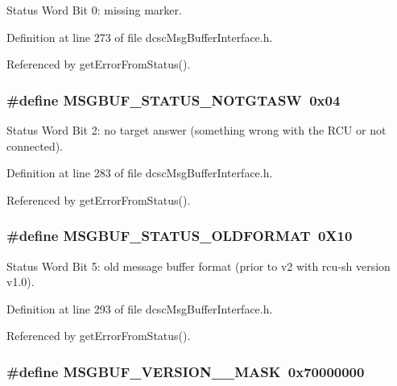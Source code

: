 Status Word Bit 0: missing marker. 



Definition at line 273 of file dcsc\-Msg\-Buffer\-Interface.h.

Referenced by get\-Error\-From\-Status().\hypertarget{group__dcsc__msg__buffer__access_g4eee888217162b8a35eb12d67cb4693b}{
\subsubsection[MSGBUF\_\-STATUS\_\-NOTGTASW]{\setlength{\rightskip}{0pt plus 5cm}\#define MSGBUF\_\-STATUS\_\-NOTGTASW~0x04}}
\label{group__dcsc__msg__buffer__access_g4eee888217162b8a35eb12d67cb4693b}


Status Word Bit 2: no target answer (something wrong with the RCU or not connected). 



Definition at line 283 of file dcsc\-Msg\-Buffer\-Interface.h.

Referenced by get\-Error\-From\-Status().\hypertarget{group__dcsc__msg__buffer__access_g63adfcc12380aecaee776059a90bae31}{
\subsubsection[MSGBUF\_\-STATUS\_\-OLDFORMAT]{\setlength{\rightskip}{0pt plus 5cm}\#define MSGBUF\_\-STATUS\_\-OLDFORMAT~0X10}}
\label{group__dcsc__msg__buffer__access_g63adfcc12380aecaee776059a90bae31}


Status Word Bit 5: old message buffer format (prior to v2 with rcu-sh version v1.0). 



Definition at line 293 of file dcsc\-Msg\-Buffer\-Interface.h.

Referenced by get\-Error\-From\-Status().\hypertarget{group__dcsc__msg__buffer__access_gd47e658eba41557f654f0f9284c97317}{
\subsubsection[MSGBUF\_\-VERSION\_\-1\_\-MASK]{\setlength{\rightskip}{0pt plus 5cm}\#define MSGBUF\_\-VERSION\_\_\-MASK~0x70000000}}
\label{group__dcsc__msg__buffer__access_gd47e658eba41557f654f0f9284c97317}


